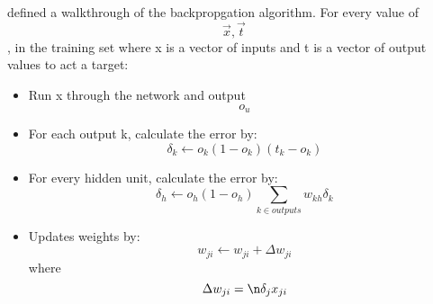 \parencite{MLANN} defined a walkthrough of the backpropgation algorithm.
For every value of \[\vec{x}, \vec{t}\], in the training set where x is a vector of inputs and t is a vector of output values to act a target:
\begin{itemize}
	\item{Run x through the network and output \[o_{u}\]}
	\item{For each output k, calculate the error by: \[\delta_{k} \leftarrow o_{k}(1 - o_{k})(t_{k} - o_{k}) \]}
	\item{For every hidden unit, calculate the error by: \[\delta_{h} \leftarrow o_{h}(1 - o_{h}) \sum_{k \in outputs}   w_{kh}\delta_{k}\]}
	\item{Updates weights by: \[w_{ji} \leftarrow w_{ji} + \Delta w_{ji}\] where \[\Delta w_{ji} = \n \delta_{j} x_{ji}\]}
\end{itemize}
